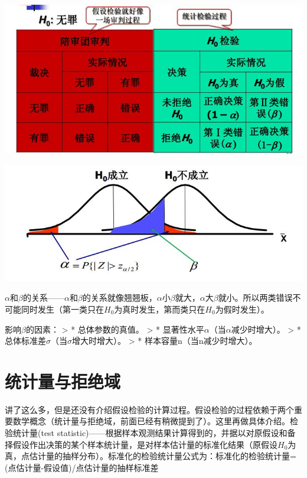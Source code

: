 \documentclass[]{ctexbook}
\begin{document}
\includegraphics[width=1\linewidth,height=0.35\textheight]{fig/fig13}

\includegraphics[width=1\linewidth,height=0.35\textheight]{fig/fig14}

\(\alpha\)和\(\beta\)的关系------\(\alpha\)和\(\beta\)的关系就像翘翘板，\(\alpha\)小\(\beta\)就大，\(\alpha\)大\(\beta\)就小。所以两类错误不可能同时发生（第一类只在\(H_0\)为真时发生，第而类只在\(H_0\)为假时发生）。

影响\(\beta\)的因素：
\textgreater{} * 总体参数的真值。
\textgreater{} * 显著性水平\(\alpha\)（当\(\alpha\)减少时增大）。
\textgreater{} * 总体标准差\(\sigma\)（当\(\sigma\)增大时增大）。
\textgreater{} * 样本容量n（当n减少时增大）。

\hypertarget{ux7edfux8ba1ux91cfux4e0eux62d2ux7eddux57df}{%
\section{统计量与拒绝域}\label{ux7edfux8ba1ux91cfux4e0eux62d2ux7eddux57df}}

讲了这么多，但是还没有介绍假设检验的计算过程。假设检验的过程依赖于两个重要数学概念（统计量与拒绝域，前面已经有稍微提到了）。这里再做具体介绍。检验统计量(test statistic)------根据样本观测结果计算得到的，并据以对原假设和备择假设作出决策的某个样本统计量，是对样本估计量的标准化结果（原假设\(H_0\)为真，点估计量的抽样分布）。标准化的检验统计量公式为：标准化的检验统计量=(点估计量-假设值)/点估计量的抽样标准差
\end{document}
